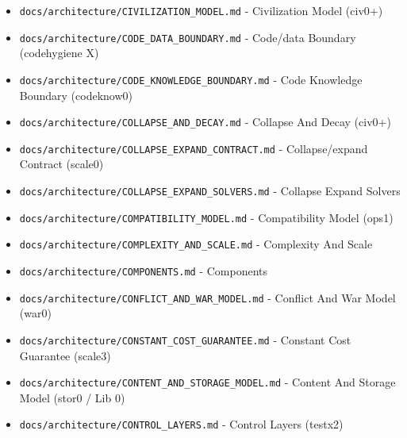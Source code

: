 \documentclass[10.5pt,a4paper,openany]{book}
\begin{document}
\begin{itemize}
\item \texttt{docs/\allowbreak{}architecture/\allowbreak{}CIVILIZATION\_\allowbreak{}MODEL.\allowbreak{}md} -\allowbreak{} Civilization Model (civ0+)
\item \texttt{docs/\allowbreak{}architecture/\allowbreak{}CODE\_\allowbreak{}DATA\_\allowbreak{}BOUNDARY.\allowbreak{}md} -\allowbreak{} Code/\allowbreak{}data Boundary (codehygiene X)
\item \texttt{docs/\allowbreak{}architecture/\allowbreak{}CODE\_\allowbreak{}KNOWLEDGE\_\allowbreak{}BOUNDARY.\allowbreak{}md} -\allowbreak{} Code Knowledge Boundary (codeknow0)
\item \texttt{docs/\allowbreak{}architecture/\allowbreak{}COLLAPSE\_\allowbreak{}AND\_\allowbreak{}DECAY.\allowbreak{}md} -\allowbreak{} Collapse And Decay (civ0+)
\item \texttt{docs/\allowbreak{}architecture/\allowbreak{}COLLAPSE\_\allowbreak{}EXPAND\_\allowbreak{}CONTRACT.\allowbreak{}md} -\allowbreak{} Collapse/\allowbreak{}expand Contract (scale0)
\item \texttt{docs/\allowbreak{}architecture/\allowbreak{}COLLAPSE\_\allowbreak{}EXPAND\_\allowbreak{}SOLVERS.\allowbreak{}md} -\allowbreak{} Collapse Expand Solvers
\item \texttt{docs/\allowbreak{}architecture/\allowbreak{}COMPATIBILITY\_\allowbreak{}MODEL.\allowbreak{}md} -\allowbreak{} Compatibility Model (ops1)
\item \texttt{docs/\allowbreak{}architecture/\allowbreak{}COMPLEXITY\_\allowbreak{}AND\_\allowbreak{}SCALE.\allowbreak{}md} -\allowbreak{} Complexity And Scale
\item \texttt{docs/\allowbreak{}architecture/\allowbreak{}COMPONENTS.\allowbreak{}md} -\allowbreak{} Components
\item \texttt{docs/\allowbreak{}architecture/\allowbreak{}CONFLICT\_\allowbreak{}AND\_\allowbreak{}WAR\_\allowbreak{}MODEL.\allowbreak{}md} -\allowbreak{} Conflict And War Model (war0)
\item \texttt{docs/\allowbreak{}architecture/\allowbreak{}CONSTANT\_\allowbreak{}COST\_\allowbreak{}GUARANTEE.\allowbreak{}md} -\allowbreak{} Constant Cost Guarantee (scale3)
\item \texttt{docs/\allowbreak{}architecture/\allowbreak{}CONTENT\_\allowbreak{}AND\_\allowbreak{}STORAGE\_\allowbreak{}MODEL.\allowbreak{}md} -\allowbreak{} Content And Storage Model (stor0 /\allowbreak{} Lib 0)
\item \texttt{docs/\allowbreak{}architecture/\allowbreak{}CONTROL\_\allowbreak{}LAYERS.\allowbreak{}md} -\allowbreak{} Control Layers (testx2)

\end{itemize}
\end{document}
